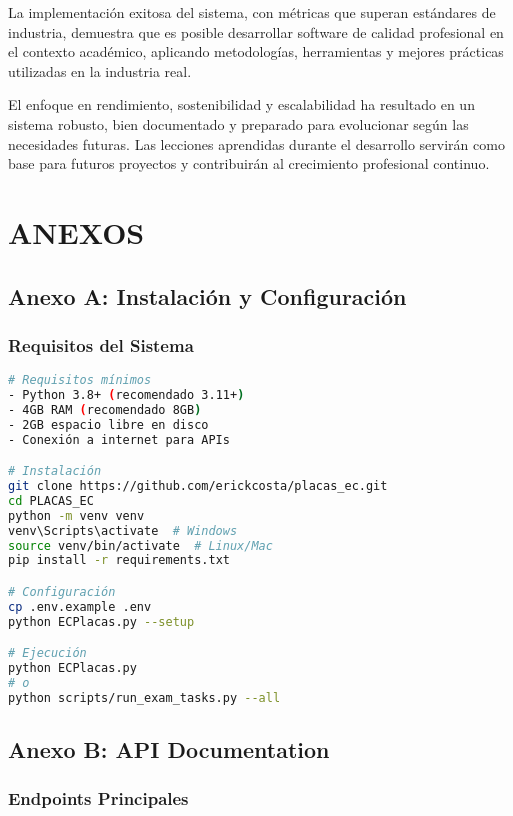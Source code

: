 \documentclass[12pt,a4paper]{article}
\begin{document}
La implementación exitosa del sistema, con métricas que superan estándares de industria, demuestra que es posible desarrollar software de calidad profesional en el contexto académico, aplicando metodologías, herramientas y mejores prácticas utilizadas en la industria real.

El enfoque en rendimiento, sostenibilidad y escalabilidad ha resultado en un sistema robusto, bien documentado y preparado para evolucionar según las necesidades futuras. Las lecciones aprendidas durante el desarrollo servirán como base para futuros proyectos y contribuirán al crecimiento profesional continuo.

\section{ANEXOS}

\subsection{Anexo A: Instalación y Configuración}

\subsubsection{Requisitos del Sistema}

\begin{lstlisting}[language=bash]
# Requisitos mínimos
- Python 3.8+ (recomendado 3.11+)
- 4GB RAM (recomendado 8GB)
- 2GB espacio libre en disco
- Conexión a internet para APIs

# Instalación
git clone https://github.com/erickcosta/placas_ec.git
cd PLACAS_EC
python -m venv venv
venv\Scripts\activate  # Windows
source venv/bin/activate  # Linux/Mac
pip install -r requirements.txt

# Configuración
cp .env.example .env
python ECPlacas.py --setup

# Ejecución
python ECPlacas.py
# o
python scripts/run_exam_tasks.py --all
\end{lstlisting}

\subsection{Anexo B: API Documentation}

\subsubsection{Endpoints Principales}
\end{document}
